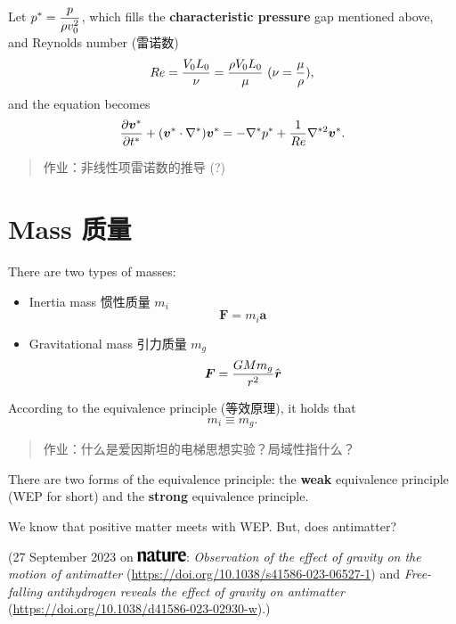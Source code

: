 Let \(\displaystyle p^* = {p \over \rho v_0^2}\), which fills the
\textbf{characteristic pressure} gap mentioned above, and Reynolds
number (雷诺数)
\[Re = {V_0L_0 \over \nu} = {\rho V_0L_0 \over \mu} \ (\nu = {\mu \over \rho}),\]
and the equation becomes
\[{\partial \boldsymbol v^* \over \partial t^*} + (\boldsymbol v^* \cdot \nabla^*) \boldsymbol v^* = - \nabla^* p^* + {1 \over Re} \nabla^{*2} \boldsymbol v^*.\]

\begin{quote}
作业：非线性项雷诺数的推导 (?)
\end{quote}

\section{Mass 质量}\label{mass-ux8d28ux91cf}

There are two types of masses:

\begin{itemize}
\tightlist{}
\item
  Inertia mass 惯性质量 \(m_i\) \[\boldsymbol F = m_i \boldsymbol a\]
\item
  Gravitational mass 引力质量 \(m_g\)
  \[\boldsymbol F = {GMm_g \over r^2} \hat{\boldsymbol r} \]
\end{itemize}

According to the equivalence principle (等效原理), it holds that
\[m_i \equiv m_g.\]

\begin{quote}
作业：什么是爱因斯坦的电梯思想实验？局域性指什么？
\end{quote}

There are two forms of the equivalence principle: the \textbf{weak}
equivalence principle (WEP for short) and the \textbf{strong}
equivalence principle.

We know that positive matter meets with WEP. But, does antimatter?

(27 September 2023 on \includegraphics[height=10pt]{assets/Nature.png}: \emph{Observation of the effect of gravity on the motion of antimatter} (\url{https://doi.org/10.1038/s41586-023-06527-1}) and \emph{Free-falling antihydrogen reveals the effect of gravity on antimatter} (\url{https://doi.org/10.1038/d41586-023-02930-w}).)
